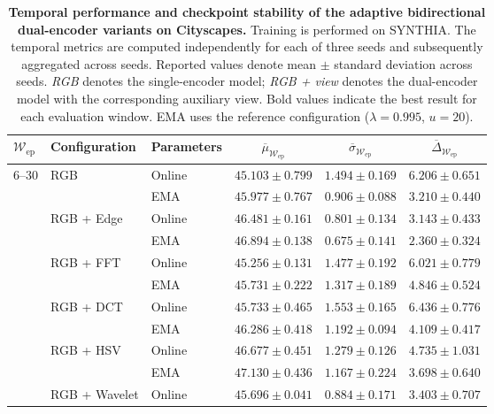 \begin{table}[htbp]
\centering
\caption[SYNTHIA results: adaptive bidirectional dual encoder on Cityscapes across evaluation windows]{%
\textbf{Temporal performance and checkpoint stability of the adaptive bidirectional
dual-encoder variants on Cityscapes.}
Training is performed on SYNTHIA. The temporal metrics are computed
independently for each of three seeds and subsequently aggregated across
seeds. Reported values denote mean $\pm$ standard deviation across seeds.
\emph{RGB} denotes the single-encoder model; \emph{RGB + view} denotes the
dual-encoder model with the corresponding auxiliary view. Bold values indicate the best result for each evaluation window.
EMA uses the reference configuration ($\lambda=0.995$, $u=20$).}
\label{tab:synthia_dual_adaptive_windows_cityscapes}
\small
\begin{tabular}{lllccc}
\toprule
$\mathcal{W}_{\mathrm{ep}}$ & Configuration & Parameters
& $\overline{\mu}_{\mathcal{W}_{\mathrm{ep}}}$
& $\overline{\sigma}_{\mathcal{W}_{\mathrm{ep}}}$
& $\overline{\Delta}_{\mathcal{W}_{\mathrm{ep}}}$ \\
\midrule
\multirow{12}{*}{6--30} & \multirow{2}{*}{RGB} & Online & $45.103 \pm 0.799$ & $1.494 \pm 0.169$ & $6.206 \pm 0.651$ \\
 &  & EMA & $45.977 \pm 0.767$ & $0.906 \pm 0.088$ & $3.210 \pm 0.440$ \\
\addlinespace[2pt]
 & \multirow{2}{*}{RGB + Edge} & Online & $46.481 \pm 0.161$ & $0.801 \pm 0.134$ & $3.143 \pm 0.433$ \\
 &  & EMA & $46.894 \pm 0.138$ & $\mathbf{0.675 \pm 0.141}$ & $\mathbf{2.360 \pm 0.324}$ \\
\addlinespace[2pt]
 & \multirow{2}{*}{RGB + FFT} & Online & $45.256 \pm 0.131$ & $1.477 \pm 0.192$ & $6.021 \pm 0.779$ \\
 &  & EMA & $45.731 \pm 0.222$ & $1.317 \pm 0.189$ & $4.846 \pm 0.524$ \\
\addlinespace[2pt]
 & \multirow{2}{*}{RGB + DCT} & Online & $45.733 \pm 0.465$ & $1.553 \pm 0.165$ & $6.436 \pm 0.776$ \\
 &  & EMA & $46.286 \pm 0.418$ & $1.192 \pm 0.094$ & $4.109 \pm 0.417$ \\
\addlinespace[2pt]
 & \multirow{2}{*}{RGB + HSV} & Online & $46.677 \pm 0.451$ & $1.279 \pm 0.126$ & $4.735 \pm 1.031$ \\
 &  & EMA & $\mathbf{47.130 \pm 0.436}$ & $1.167 \pm 0.224$ & $3.698 \pm 0.640$ \\
\addlinespace[2pt]
 & \multirow{2}{*}{RGB + Wavelet} & Online & $45.696 \pm 0.041$ & $0.884 \pm 0.171$ & $3.403 \pm 0.707$ \\

\end{tabular}
\end{table}
